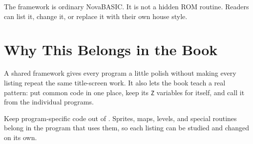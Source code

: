 \begin{novabox}
The framework is ordinary NovaBASIC. It is not a hidden ROM routine. Readers can
list it, change it, or replace it with their own house style.
\end{novabox}

\section{Why This Belongs in the Book}

A shared framework gives every program a little polish without making every
listing repeat the same title-screen work. It also lets the book teach a real
pattern: put common code in one place, keep its \texttt{Z} variables for
itself, and call it from the individual programs.

\begin{typeinbox}
Keep program-specific code out of \commonlisting. Sprites, maps, levels, and
special routines belong in the program that uses them, so each listing can be
studied and changed on its own.
\end{typeinbox}
